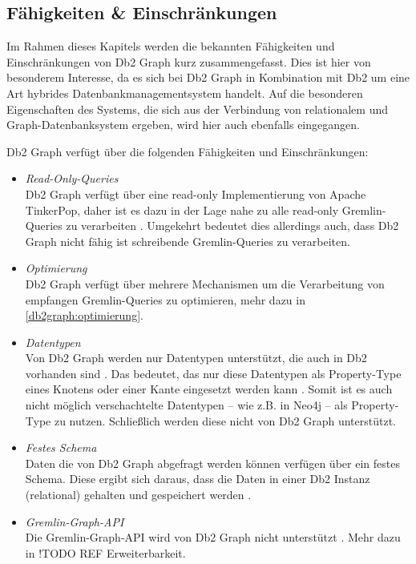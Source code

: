 \subsection{Fähigkeiten \& Einschränkungen}
Im Rahmen dieses Kapitels werden die bekannten Fähigkeiten und Einschränkungen von Db2 Graph kurz zusammengefasst. Dies ist hier von besonderem Interesse, da es sich bei Db2 Graph in Kombination mit Db2 um eine Art hybrides Datenbankmanagementsystem handelt. Auf die besonderen Eigenschaften des Systems, die sich aus der Verbindung von relationalem und Graph-Datenbanksystem ergeben, wird hier auch ebenfalls eingegangen. 

Db2 Graph verfügt über die folgenden Fähigkeiten und Einschränkungen:

\begin{itemize}
    \item \textit{Read-Only-Queries}\\
    Db2 Graph verfügt über eine read-only Implementierung von Apache TinkerPop, daher ist es dazu in der Lage nahe zu alle read-only Gremlin-Queries zu verarbeiten \cite{ibm_docs_limitiations}. Umgekehrt bedeutet dies allerdings auch, dass Db2 Graph nicht fähig ist schreibende Gremlin-Queries zu verarbeiten.
    \item \textit{Optimierung}\\
    Db2 Graph verfügt über mehrere Mechanismen um die Verarbeitung von empfangen Gremlin-Queries zu optimieren, mehr dazu in \autoref{db2graph:optimierung}.
    \item \textit{Datentypen}\\
    Von Db2 Graph werden nur Datentypen unterstützt, die auch in Db2 vorhanden sind \cite{ibm_docs_limitiations}. Das bedeutet, das nur diese Datentypen als Property-Type eines Knotens oder einer Kante eingesetzt werden kann \cite{ibm_docs_limitiations}. Somit ist es auch nicht möglich verschachtelte Datentypen -- wie z.B. in Neo4j -- als Property-Type zu nutzen. Schließlich werden diese nicht von Db2 Graph unterstützt.
    \item \textit{Festes Schema}\\
    Daten die von Db2 Graph abgefragt werden können verfügen über ein festes Schema. Diese ergibt sich daraus, dass die Daten in einer Db2 Instanz (relational) gehalten und gespeichert werden \cite{sigmod_tian,vldb_tian,yt_tian}.
    \item \textit{Gremlin-Graph-API}\\
    Die Gremlin-Graph-API wird von Db2 Graph nicht unterstützt \cite{ibm_docs_limitiations}. Mehr dazu in !TODO REF Erweiterbarkeit.
\end{itemize}

